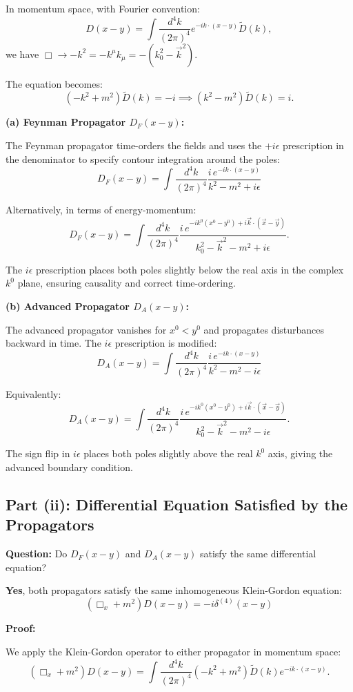 \documentclass[11pt, a4paper]{article}
\newcommand{\be}{\begin{equation}}
\newcommand{\ee}{\end{equation}}
\begin{document}
In momentum space, with Fourier convention:
\be
D(x-y) = \int \frac{d^4k}{(2\pi)^4} e^{-ik\cdot(x-y)} \tilde{D}(k),
\ee
we have $\Box \to -k^2 = -k^\mu k_\mu = -(k_0^2 - \vec{k}^2)$.

The equation becomes:
\be
(-k^2 + m^2)\tilde{D}(k) = -i \implies (k^2 - m^2)\tilde{D}(k) = i.
\ee

\textbf{(a) Feynman Propagator $D_F(x-y)$:}

The Feynman propagator time-orders the fields and uses the $+i\epsilon$ prescription in the denominator to specify contour integration around the poles:
\be
\boxed{D_F(x-y) = \int \frac{d^4k}{(2\pi)^4} \frac{i\,e^{-ik\cdot(x-y)}}{k^2 - m^2 + i\epsilon}}
\ee

Alternatively, in terms of energy-momentum:
\be
D_F(x-y) = \int \frac{d^4k}{(2\pi)^4} \frac{i\,e^{-ik^0(x^0-y^0) + i\vec{k}\cdot(\vec{x}-\vec{y})}}{k_0^2 - \vec{k}^2 - m^2 + i\epsilon}.
\ee

The $i\epsilon$ prescription places both poles slightly below the real axis in the complex $k^0$ plane, ensuring causality and correct time-ordering.

\textbf{(b) Advanced Propagator $D_A(x-y)$:}

The advanced propagator vanishes for $x^0 < y^0$ and propagates disturbances backward in time. The $i\epsilon$ prescription is modified:
\be
\boxed{D_A(x-y) = \int \frac{d^4k}{(2\pi)^4} \frac{i\,e^{-ik\cdot(x-y)}}{k^2 - m^2 - i\epsilon}}
\ee

Equivalently:
\be
D_A(x-y) = \int \frac{d^4k}{(2\pi)^4} \frac{i\,e^{-ik^0(x^0-y^0) + i\vec{k}\cdot(\vec{x}-\vec{y})}}{k_0^2 - \vec{k}^2 - m^2 - i\epsilon}.
\ee

The sign flip in $i\epsilon$ places both poles slightly above the real $k^0$ axis, giving the advanced boundary condition.


\subsection{Part (ii): Differential Equation Satisfied by the Propagators}

\textbf{Question:} Do $D_F(x-y)$ and $D_A(x-y)$ satisfy the same differential equation?

\textbf{Yes}, both propagators satisfy the same inhomogeneous Klein-Gordon equation:
\be
\boxed{(\Box_x + m^2)D(x-y) = -i\delta^{(4)}(x-y)}
\ee

\textbf{Proof:}

We apply the Klein-Gordon operator to either propagator in momentum space:
\be
(\Box_x + m^2)D(x-y) = \int \frac{d^4k}{(2\pi)^4} (-k^2 + m^2) \tilde{D}(k) e^{-ik\cdot(x-y)}.
\ee
\end{document}
